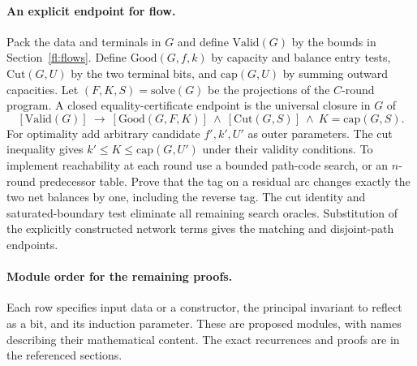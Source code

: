 \paragraph{An explicit endpoint for flow.}
Pack the data and terminals in $G$ and define $\mathrm{Valid}(G)$ by the
bounds in Section~\ref{fl:flows}. Define $\mathrm{Good}(G,f,k)$ by capacity
and balance entry tests, $\mathrm{Cut}(G,U)$ by the two terminal bits,
and $\mathrm{cap}(G,U)$ by summing outward capacities. Let
$(F,K,S)=\mathrm{solve}(G)$ be the projections of the $C$-round program.
A closed equality-certificate endpoint is the universal closure in $G$ of
\[
 [\mathrm{Valid}(G)]\ \longrightarrow\
 [\mathrm{Good}(G,F,K)]\ \land\ [\mathrm{Cut}(G,S)]\
             \land\ K=\mathrm{cap}(G,S).
\]
For optimality add arbitrary candidate $f',k',U'$ as outer parameters.
The cut inequality gives $k'\le K\le\mathrm{cap}(G,U')$ under their
validity conditions. To implement reachability at each round use a bounded
path-code search, or an $n$-round predecessor table. Prove that the tag on a
residual arc changes exactly the two net balances by one, including the
reverse tag. The cut identity and saturated-boundary test eliminate all
remaining search oracles. Substitution of the explicitly constructed network
terms gives the matching and disjoint-path endpoints.

\paragraph{Module order for the remaining proofs.}
Each row specifies input data or a constructor, the principal invariant
to reflect as a bit, and its induction parameter. These are proposed modules,
with names describing their mathematical content. The exact recurrences
and proofs are in the referenced sections.

